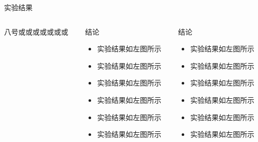 \documentclass[8pt,compress,t,notheorems,noamsthm,notheorem,xcolor=x11names]{beamer}
\theoremstyle{nonumberplain}%
\theoremstyle{plain}
\begin{document}
\begin{frame}{实验结果}
\begin{columns}
	\begin{column}{0.30\textwidth}
		八号或或或或或或或
	\end{column}
	\begin{column}{0.30\textwidth}
		\begin{Block}{结论}
			\begin{itemize}
				\item 实验结果如左图所示
				\item 实验结果如左图所示
				\item 实验结果如左图所示
				\item 实验结果如左图所示
				\item 实验结果如左图所示
				\item 实验结果如左图所示
			\end{itemize}
		\end{Block}
	\end{column}
	
	\begin{column}{0.30\textwidth}
		\begin{block}{结论}
			\begin{itemize}
				\item 实验结果如左图所示
				\item 实验结果如左图所示
				\item 实验结果如左图所示
				\item 实验结果如左图所示
				\item 实验结果如左图所示
				\item 实验结果如左图所示
			\end{itemize}
		\end{block}
	\end{column}
\end{columns}
\end{frame}
\end{document}
